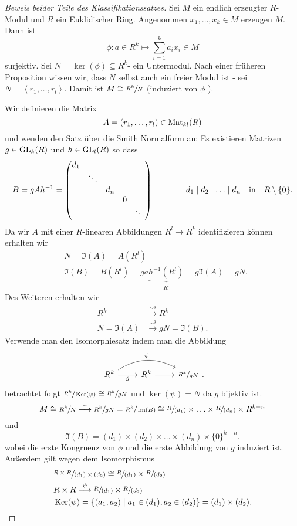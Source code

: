 \begin{proof}[Beweis beider Teile des Klassifikationssatzes]
	Sei $M$ ein endlich erzeugter $R$-Modul und $R$ ein Euklidischer Ring.
	Angenommen $x_1,\ldots,x_{k} \in M$ erzeugen $M$. Dann ist
	\[
	\phi: a \in R^{k} \mapsto \sum_{i=1}^{k} a_{i} x_{i} \in M
	\] 
	surjektiv. Sei $N = \ker(\phi) \subseteq R^{k}$- ein Untermodul. Nach einer früheren Proposition wissen wir, dass $N$ selbst
	auch ein freier Modul ist -  sei $N = \left< r_1,\ldots,r_{l} \right>$. Damit ist $M \cong \sfrac{R^{k}}{N}$ (induziert von $\phi$ ).

	Wir definieren die Matrix
	\[
		A = (r_1,\ldots,r_{l}) \in \operatorname{Mat}_{kl}(R)
	\] 
	und wenden den Satz über die Smith Normalform an: Es existieren Matrizen $g \in \operatorname{GL}_{k}(R)$ und $h \in \operatorname{GL}_{l}(R)$ so dass
	\[
	B = g A h^{-1} = \begin{pmatrix} 
		d_1 \\
		& \ddots \\
		& & d_{n} \\
		& & & 0 \\
		& & & & \ddots
	\end{pmatrix} \qquad \qquad d_1 \mid d_2 \mid \ldots \mid d_{n} \qq{in} R \setminus \{0\}  
	.\] 
	Da wir $A$ mit einer $R$-linearen Abbildungen $R^{l} \to R^{k}$ identifizieren können erhalten wir
	\begin{align*}
		&N = \Im(A) = A(R^{l})\\
		&\Im(B) = B(R^{l}) = g a \underbrace{h ^{-1}(R^{l})}_{R^{l}} = g \Im(A) = g N
	.\end{align*}
	Des Weiteren erhalten wir
	\begin{align*}
		R^{k} &\overset{\sim^{g}}{\longrightarrow} R^{k}\\
		N = \Im(A) &\overset{\sim^{g}}{\longrightarrow} g N = \Im(B)
	.\end{align*}
	Verwende man den Isomorphiesatz indem man die Abbildung
	\[
		\begin{tikzcd}
			R^k \arrow[r, "g"'] \arrow[rr, "\psi", bend left] & R^k \arrow[r] & \sfrac{R^k}{gN}
		\end{tikzcd}
	.\] 
	betrachtet folgt $\sfrac{R^{k}}{\operatorname{Ker}(\psi)} \cong \sfrac{R^{k}}{gN}$ und $\ker(\psi) = N$ da $g$ bijektiv ist.
	\[
		M \cong \sfrac{R^{k}}{N} \overset{\sim}{\longrightarrow} \sfrac{R^{k}}{gN} = \sfrac{R^{k}}{\Im(B)} \cong \sfrac{R}{(d_1)} \times  \ldots \times \sfrac{R}{(d_{n})} \times  R^{k-n}
	\] 
	und
	\[
		\Im(B) = (d_1) \times (d_2) \times \ldots \times (d_{n}) \times  \{0\}^{k-n}
	.\]
	wobei die erste Kongruenz von $\phi$ und die erste Abbildung von  $g$ induziert ist.
	Außerdem gilt wegen dem Isomorphismus
	\begin{align*}
		&\sfrac{R \times R}{(d_1) \times (d_2)} \cong \sfrac{R}{(d_1)} \times \sfrac{R}{(d_2)}\\
		&R \times R \overset{\psi}{\longrightarrow} \sfrac{R}{(d_1)} \times \sfrac{R}{(d_2)}\\
		&\operatorname{Ker}(\psi) = \{(a_1,a_2) \mid a_1 \in (d_1), a_2 \in (d_2)\} = (d_1) \times (d_2)
	.\end{align*} 
\end{proof}

